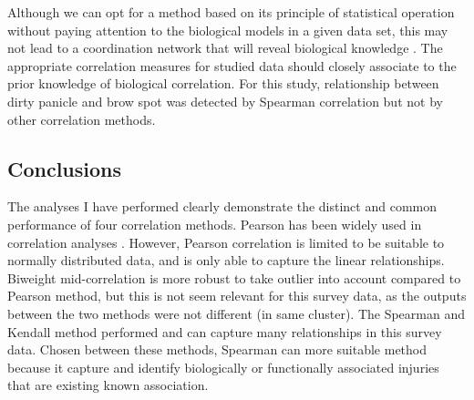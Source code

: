 Although we can opt for a method based on its principle of statistical operation without paying attention to the biological models in a given data set, this may not lead to a coordination network that will reveal biological knowledge \citep{Kumari_2012_Evaluation}. The appropriate correlation measures for studied data should closely associate to the prior knowledge of biological correlation. For this study, relationship between dirty panicle and brow spot was detected by Spearman correlation but not by other correlation methods.

\newpage
\subsection{Conclusions}

The analyses I have performed clearly demonstrate the distinct and common performance of four correlation methods. Pearson has been widely used in correlation analyses \citep{Zhang_2005_General}. However, Pearson correlation is limited to be suitable to normally distributed data, and is only able to capture the linear relationships. Biweight mid-correlation is more robust to  take outlier  into account compared to Pearson method, but this is not seem relevant for this survey data, as the outputs between the two methods were not different (in same cluster). The Spearman and Kendall method performed and can capture many relationships in this survey data. Chosen between these methods, Spearman can more suitable method because it capture and identify biologically or functionally associated injuries that are existing known association.

